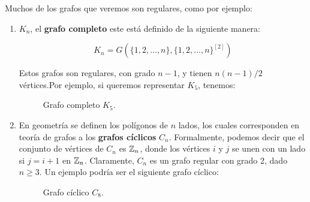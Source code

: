 Muchos de los grafos que veremos son regulares, como por ejemplo:

\begin{enumerate}
    \item $K_n$, el \textbf{grafo completo} este está definido de la siguiente manera:
    
    \[
    K_n = G(\{1,2, \dots, n\}, \{1,2, \dots, n\}^{[2]})
    \]
    
    Estos grafos son regulares, con grado $n-1$, y tienen $n(n-1)/2$ vértices.Por ejemplo, si queremos representar $K_5$, tenemos:
    
    \begin{figure}[h]
        \centering
        \caption{Grafo completo $K_5$.}
    \end{figure}
    
    \item En geometría se definen los polígonos de $n$ lados, los cuales corresponden en teoría de grafos a los \textbf{grafos cíclicos} $C_n$. Formalmente, podemos decir que el conjunto de vértices de $C_n$ es $\mathbb{Z}_n$, donde los vértices $i$ y $j$ se unen con un lado si $j = i + 1$ en $\mathbb{Z}_n$. Claramente, $C_n$ es un grafo regular con grado 2, dado $n \geq 3$. Un ejemplo podría ser el siguiente grafo cíclico:
    
    \begin{figure}[h]
        \centering
        \caption{Grafo cíclico $C_8$.}
    \end{figure}
\end{enumerate}